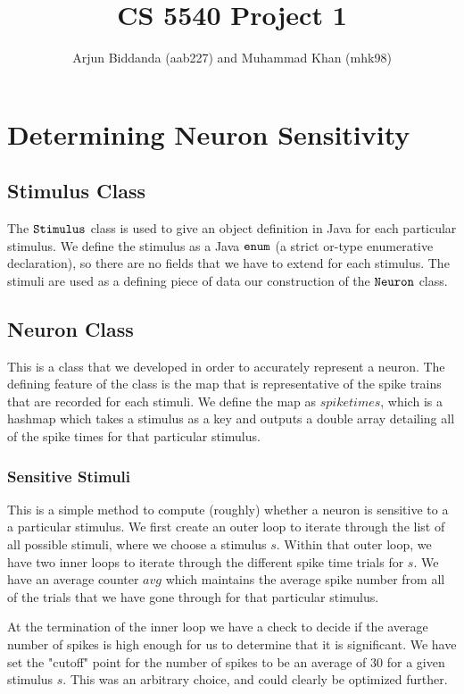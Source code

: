 \documentclass[12pt]{article} %
\title{CS 5540 Project 1}
\author{Arjun Biddanda (aab227) and Muhammad Khan (mhk98)}
\begin{document}
\maketitle

\section{Determining Neuron Sensitivity}
\subsection{Stimulus Class}
The $\tt{Stimulus}$ class is used to give an object definition in Java for each particular stimulus. We define the stimulus as a Java $\tt{enum}$ (a strict or-type enumerative declaration), so there are no fields that we have to extend for each stimulus. The stimuli are used as a defining piece of data our construction of the $\tt{Neuron}$ class.

\subsection{Neuron Class}
This is a class that we developed in order to accurately represent a neuron. The defining feature of the class is the map that is representative of the spike trains that are recorded for each stimuli. We define the map as $spiketimes$, which is a hashmap which takes a stimulus as a key and outputs a double array detailing all of the spike times for that particular stimulus. 
\subsubsection{Sensitive Stimuli}
This is a simple method to compute (roughly) whether a neuron is sensitive to a a particular stimulus. We first create an outer loop to iterate through the list of all possible stimuli, where we choose a stimulus $s$. Within that outer loop, we have two inner loops to iterate through the different spike time trials for $s$. We have an average counter $avg$ which maintains the average spike number from all of the trials that we have gone through for that particular stimulus. 

At the termination of the inner loop we have a check to decide if the average number of spikes is high enough for us to determine that it is significant. We have set the "cutoff" point for the number of spikes to be an average of 30 for a given stimulus $s$. This was an arbitrary choice, and could clearly be optimized further. 
\end{document}
